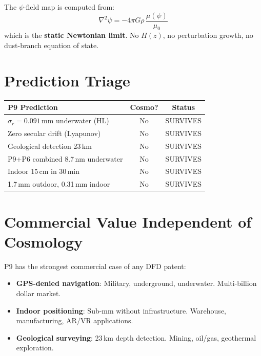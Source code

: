 \documentclass[11pt]{article}
\begin{document}
The $\psi$-field map is computed from:
\begin{equation}
\nabla^2\psi = -4\pi G\rho\,\frac{\mu(\psi)}{\mu_0}
\end{equation}
which is the \textbf{static Newtonian limit}. No $H(z)$, no
perturbation growth, no dust-branch equation of state.

\section{Prediction Triage}

\begin{table}[h]
\centering
\begin{tabular}{lcc}
\toprule
\textbf{P9 Prediction} & \textbf{Cosmo?} & \textbf{Status} \\
\midrule
$\sigma_r = 0.091$\,mm underwater (HL) & No & SURVIVES \\
Zero secular drift (Lyapunov) & No & SURVIVES \\
Geological detection 23\,km & No & SURVIVES \\
P9+P6 combined 8.7\,nm underwater & No & SURVIVES \\
Indoor 15\,cm in 30\,min & No & SURVIVES \\
1.7\,mm outdoor, 0.31\,mm indoor & No & SURVIVES \\
\bottomrule
\end{tabular}
\end{table}

\section{Commercial Value Independent of Cosmology}

P9 has the strongest commercial case of any DFD patent:

\begin{itemize}
\item \textbf{GPS-denied navigation}: Military, underground, underwater.
  Multi-billion dollar market.
\item \textbf{Indoor positioning}: Sub-mm without infrastructure.
  Warehouse, manufacturing, AR/VR applications.
\item \textbf{Geological surveying}: 23\,km depth detection.
  Mining, oil/gas, geothermal exploration.
\end{itemize}
\end{document}
